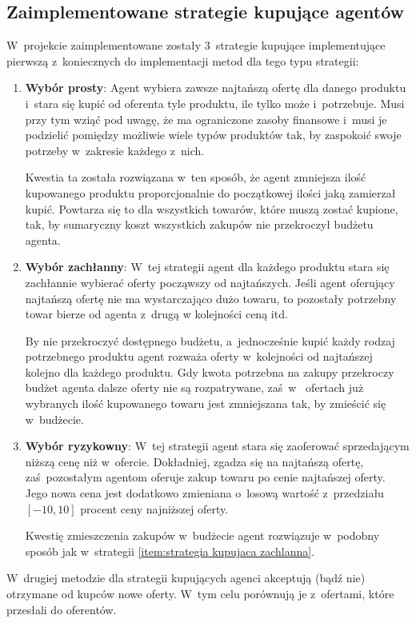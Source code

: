 \documentclass[12pt]{article}
\begin{document}
\subsection{Zaimplementowane strategie kupujące agentów}
W~projekcie zaimplementowane zostały 3~strategie kupujące implementujące pierwszą z~koniecznych do implementacji metod dla tego typu strategii:
\begin{enumerate}
 \item \textbf{Wybór prosty}: Agent wybiera zawsze najtańszą ofertę dla danego produktu i~stara się kupić od oferenta tyle produktu, ile tylko może i~potrzebuje.
Musi przy tym wziąć pod uwagę, że ma ograniczone zasoby finansowe i~musi je podzielić pomiędzy możliwie wiele typów produktów tak, by zaspokoić swoje potrzeby w~zakresie każdego z~nich.

Kwestia ta została rozwiązana w~ten sposób, że agent zmniejsza ilość kupowanego produktu proporcjonalnie do początkowej ilości jaką zamierzał kupić.
Powtarza się to dla wszystkich towarów, które muszą zostać kupione, tak, by sumaryczny koszt wszystkich zakupów nie przekroczył budżetu agenta.
 \item \textbf{Wybór zachłanny}: W~tej strategii agent dla każdego produktu stara się zachłannie wybierać oferty począwszy od najtańszych. 
Jeśli agent oferujący najtańszą ofertę nie ma wystarczająco dużo towaru, to pozostały potrzebny towar bierze od agenta z~drugą w kolejności ceną itd.

By nie przekroczyć dostępnego budżetu, a~jednocześnie kupić każdy rodzaj potrzebnego produktu agent rozważa oferty w~kolejności od najtańszej kolejno dla każdego produktu. Gdy kwota potrzebna na zakupy
przekroczy budżet agenta dalsze oferty nie są rozpatrywane, zaś~w~ ofertach już wybranych ilość kupowanego towaru jest zmniejszana tak, by zmieścić się w~budżecie.
 \label{item:strategia kupujaca zachlanna} 
 \item \textbf{Wybór ryzykowny}: W~tej strategii agent stara się zaoferować sprzedającym niższą cenę niż w~ofercie. Dokładniej, zgadza się na najtańszą ofertę, zaś~pozostałym agentom
oferuje zakup towaru po cenie najtańszej oferty. Jego nowa cena jest dodatkowo zmieniana o~losową wartość z~przedziału $[-10, 10]$ procent ceny najniższej oferty.

Kwestię zmieszczenia zakupów w~budżecie agent rozwiązuje w~podobny sposób jak w~strategii \ref{item:strategia kupujaca zachlanna}.
\end{enumerate}

W~drugiej metodzie dla strategii kupujących agenci akceptują (bądź nie) otrzymane od kupców nowe oferty. W~tym celu porównują je z~ofertami, które przesłali do oferentów. 
\end{document}
